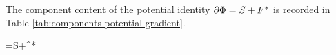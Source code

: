\noindent The component content of the potential identity \(\partial\Phi=S+F^{*}\) is recorded in Table \ref{tab:components-potential-gradient}.
\begin{componenttable}{\pv{\partial}\pv{\Phi}=S+^{*}}
\end{componenttable}
